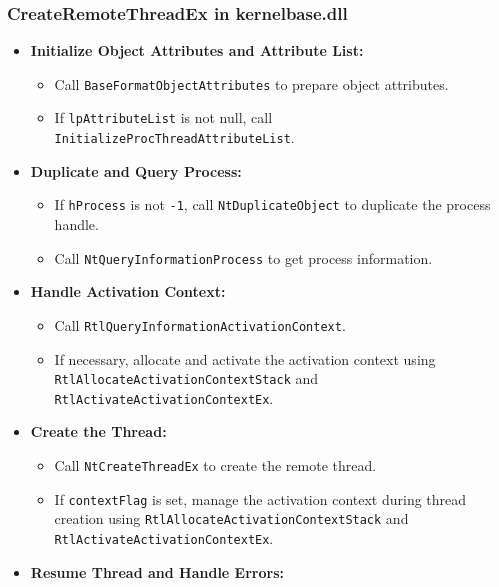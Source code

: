\begin{frame}[fragile]
    \frametitle{CreateRemoteThreadEx in kernelbase.dll}
    \small
    \begin{itemize}
        \item \textbf{Initialize Object Attributes and Attribute List:}
        \begin{itemize}
            \tiny
            \item Call \texttt{\color{blue}BaseFormatObjectAttributes} to prepare object attributes.
            \item If \texttt{lpAttributeList} is not null, call \texttt{\color{blue}InitializeProcThreadAttributeList}.
        \end{itemize}
        \item \textbf{Duplicate and Query Process:}
        \begin{itemize}
            \tiny
            \item If \texttt{hProcess} is not \texttt{-1}, call \texttt{\color{blue}NtDuplicateObject} to duplicate the process handle.
            \item Call \texttt{\color{blue}NtQueryInformationProcess} to get process information.
        \end{itemize}
        \item \textbf{Handle Activation Context:}
        \begin{itemize}
            \tiny
            \item Call \texttt{\color{blue}RtlQueryInformationActivationContext}.
            \item If necessary, allocate and activate the activation context using \texttt{\color{blue}RtlAllocateActivationContextStack} and \texttt{\color{blue}RtlActivateActivationContextEx}.
        \end{itemize}
        \item \textbf{Create the Thread:}
        \begin{itemize}
            \tiny
            \item Call \texttt{\color{blue}NtCreateThreadEx} to create the remote thread.
            \item If \texttt{contextFlag} is set, manage the activation context during thread creation using 
            \texttt{\color{blue}RtlAllocateActivationContextStack} and \texttt{\color{blue}RtlActivateActivationContextEx}.
        \end{itemize}
        \item \textbf{Resume Thread and Handle Errors:}

\end{itemize}
\end{frame}
